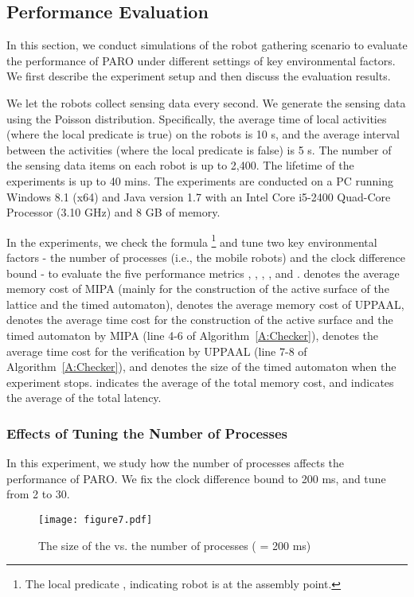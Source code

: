 \documentclass[10pt,conference,compsocconf,letterpaper]{IEEEtran}
\begin{document}
\subsection{Performance Evaluation}\label{sec:Performance Evaluation}

In this section, we conduct simulations of the robot gathering scenario to evaluate the performance of \textsf{PARO} under different settings of key environmental factors. We first describe the experiment setup and then discuss the evaluation results.

We let the robots collect sensing data every second. We generate the sensing data using the Poisson distribution. Specifically, the average time of local activities (where the local predicate is true) on the robots is 10 s, and the average interval between the activities (where the local predicate is false) is 5 s. The number of the sensing data items on each robot is up to 2,400. The lifetime of the experiments is up to 40 mins. The experiments are conducted on a PC running Windows 8.1 (x64) and Java version 1.7 with an Intel Core i5-2400 Quad-Core Processor (3.10 GHz) and 8 GB of memory.

In the experiments, we check the formula \footnote{The local predicate , indicating robot  is at the assembly point.} and tune two key environmental factors - the number of processes (i.e., the mobile robots)  and the clock difference bound  - to evaluate the five performance metrics , , , , and .  denotes the average memory cost of MIPA (mainly for the construction of the active surface of the lattice and the timed automaton),  denotes the average memory cost of UPPAAL,  denotes the average time cost for the construction of the active surface and the timed automaton by MIPA (line 4-6 of Algorithm~\ref{A:Checker}),  denotes the average time cost for the verification by UPPAAL (line 7-8 of Algorithm~\ref{A:Checker}), and  denotes the size of the timed automaton  when the experiment stops.  indicates the average of the total memory cost, and  indicates the average of the total latency.


\subsubsection{Effects of Tuning the Number of Processes}

In this experiment, we study how the number of processes  affects the performance of \textsf{PARO}. We fix the clock difference bound  to 200 ms, and tune  from 2 to 30.
\begin{figure}[tbp]
\begin{center}
  \texttt{[image: figure7.pdf]}
  \caption{The size of the  vs. the number of processes ( = 200 ms)}
  \label{F:size TA np}
\end{center}
\end{figure}
\end{document}
